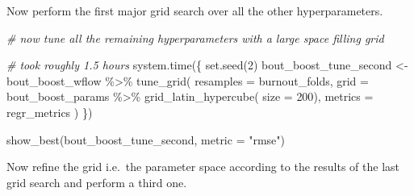 \documentclass[
]{book}
\newenvironment{Shaded}{\begin{snugshade}}{\end{snugshade}}
\newcommand{\AttributeTok}[1]{\textcolor[rgb]{0.77,0.63,0.00}{#1}}
\newcommand{\CommentTok}[1]{\textcolor[rgb]{0.56,0.35,0.01}{\textit{#1}}}
\newcommand{\DecValTok}[1]{\textcolor[rgb]{0.00,0.00,0.81}{#1}}
\newcommand{\FunctionTok}[1]{\textcolor[rgb]{0.00,0.00,0.00}{#1}}
\newcommand{\NormalTok}[1]{#1}
\newcommand{\OtherTok}[1]{\textcolor[rgb]{0.56,0.35,0.01}{#1}}
\newcommand{\SpecialCharTok}[1]{\textcolor[rgb]{0.00,0.00,0.00}{#1}}
\newcommand{\StringTok}[1]{\textcolor[rgb]{0.31,0.60,0.02}{#1}}
\begin{document}
Now perform the first major grid search over all the other hyperparameters.

\begin{Shaded}
\begin{Highlighting}[]
\CommentTok{\# now tune all the remaining hyperparameters with a large space filling grid}

\CommentTok{\# took roughly 1.5 hours}
\FunctionTok{system.time}\NormalTok{(\{}
  \FunctionTok{set.seed}\NormalTok{(}\DecValTok{2}\NormalTok{)}
\NormalTok{  bout\_boost\_tune\_second }\OtherTok{\textless{}{-}}\NormalTok{ bout\_boost\_wflow }\SpecialCharTok{\%\textgreater{}\%}
    \FunctionTok{tune\_grid}\NormalTok{(}
      \AttributeTok{resamples =}\NormalTok{ burnout\_folds,}
      \AttributeTok{grid =}\NormalTok{ bout\_boost\_params }\SpecialCharTok{\%\textgreater{}\%}
        \FunctionTok{grid\_latin\_hypercube}\NormalTok{(}
          \AttributeTok{size =} \DecValTok{200}\NormalTok{),}
      \AttributeTok{metrics =}\NormalTok{ regr\_metrics}
\NormalTok{    )}
\NormalTok{\})}

\FunctionTok{show\_best}\NormalTok{(bout\_boost\_tune\_second, }\AttributeTok{metric =} \StringTok{"rmse"}\NormalTok{)}
\end{Highlighting}
\end{Shaded}

Now refine the grid i.e.~the parameter space according to the results of the last grid search and perform a third one.
\end{document}

